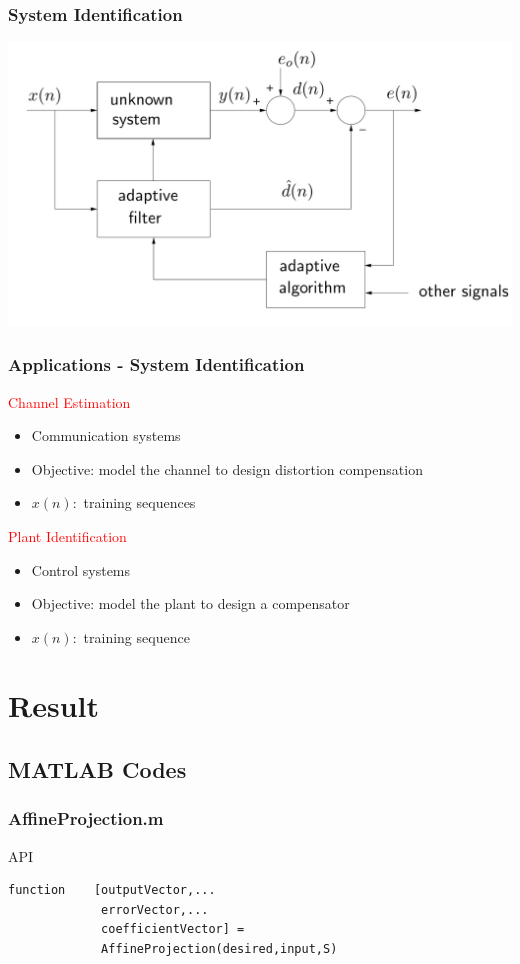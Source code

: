 \documentclass[12pt,hyperref=true,mathserif]{beamer}
\begin{document}
\begin{frame}
\frametitle{System Identification}
\begin{center}
\includegraphics[scale=0.3]{SystemIdentification.jpg}
\end{center}
\end{frame}

\begin{frame}
\frametitle{Applications - System Identification}
\textcolor{red}{Channel Estimation}
\begin{itemize}
  \item Communication systems
  \item Objective: model the channel to design distortion compensation
  \item $x(n):$ training sequences
\end{itemize}
\textcolor{red}{Plant Identification}
\begin{itemize}
  \item Control systems
  \item Objective: model the plant to design a compensator
  \item $x(n):$ training sequence
\end{itemize}
\end{frame}

\section{Result}
\subsection{MATLAB Codes}

\begin{frame}
\frametitle{AffineProjection.m}
\begin{block}{API}
\begin{verbatim}
function    [outputVector,...
             errorVector,...
             coefficientVector] =
             AffineProjection(desired,input,S)
\end{verbatim}
\end{block}
\end{frame}
\end{document}
